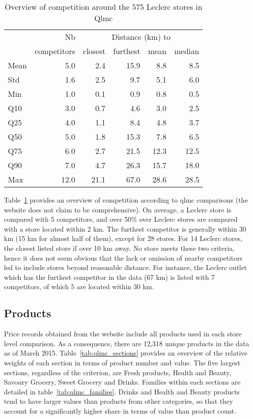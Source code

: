 \documentclass[english]{article}
\begin{document}
\begin{table}[H]
\renewcommand{\arraystretch}{0.7}%
\caption{Overview of competition around the 575 Leclerc stores in Qlmc}\label{tab:qlmc_comp}
\small
\begin{tabular}{lr|rrrr}
\toprule
\toprule
{}         & Nb          &    \multicolumn{4}{c}{Distance (km) to} \\
{}         & competitors &    closest & furthest & mean & median \\
\midrule
Mean  &   5.0 &   2.4 &  15.9 &   8.8 &     8.5 \\
Std   &   1.6 &   2.5 &   9.7 &   5.1 &     6.0 \\
Min   &   1.0 &   0.1 &   0.9 &   0.8 &     0.5 \\
Q10   &   3.0 &   0.7 &   4.6 &   3.0 &     2.5 \\
Q25   &   4.0 &   1.1 &   8.4 &   4.8 &     3.7 \\
Q50   &   5.0 &   1.8 &  15.3 &   7.8 &     6.5 \\
Q75   &   6.0 &   2.7 &  21.5 &  12.3 &    12.5 \\
Q90   &   7.0 &   4.7 &  26.3 &  15.7 &    18.0 \\
Max   &  12.0 &  21.1 &  67.0 &  28.6 &    28.5 \\
\bottomrule
\bottomrule
\end{tabular}
\end{table}

Table~\ref{tab:qlmc_comp} provides an overview of competition according to qlmc comparisons (the website does not claim to be comprehensive). On average, a Leclerc store is compared with 5 competitors, and over 50\% over Leclerc stores are compared with a store located within 2 km. The furthest competitor is generally within 30 km (15 km for almost half of them), except for 28 stores. For 14 Leclerc stores, the closest listed store if over 10 km away. No store meets these two criteria, hence it does not seem obvious that the lack or omission of nearby competitors led to include stores beyond reasonable distance. For instance, the Leclerc outlet which has the furthest competitor in the data (67 km) is listed with 7 competitors, of which 5 are located within 30 km.

\subsection{Products}

Price records obtained from the website include all products used in each store level comparison. As a consequence, there are 12,318 unique products in the data as of March 2015. Table~\ref{tab:qlmc_sections} provides an overview of the relative weights of each section in terms of product number and value. The five largest sections, regardless of the criterion, are Fresh products, Health and Beauty, Savoury Grocery, Sweet Grocery and Drinks. Families within each sections are detailed in table~\ref{tab:qlmc_families}. Drinks and Health and Beauty products tend to have larger values than products from other categories, so that they account for a significantly higher share in terms of value than product count.
\end{document}
